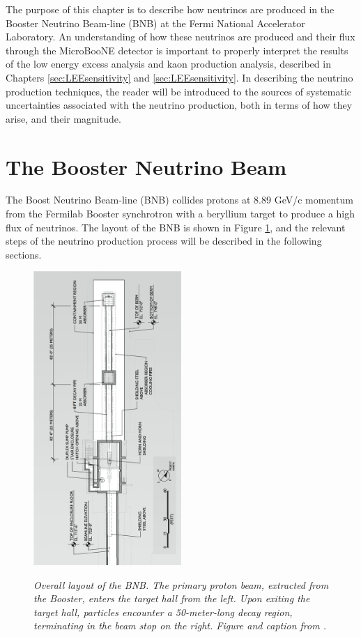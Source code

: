 The purpose of this chapter is to describe how neutrinos are produced in the Booster Neutrino Beam-line (BNB) at the Fermi National Accelerator Laboratory. An understanding of how these neutrinos are produced and their flux through the MicroBooNE detector is important to properly interpret the results of the low energy excess analysis and kaon production analysis, described in Chapters \ref{sec:LEEsensitivity} and \ref{sec:LEEsensitivity}. In describing the neutrino production techniques, the reader will be introduced to the sources of systematic uncertainties associated with the neutrino production, both in terms of how they arise, and their magnitude. 

\section{The Booster Neutrino Beam}\label{beam_descript_section}
The Boost Neutrino Beam-line (BNB) collides protons at 8.89 GeV/c momentum from the Fermilab Booster synchrotron with a beryllium target to produce a high flux of neutrinos. The layout of the BNB is shown in Figure \ref{BNB_layout_schematic}, and the relevant steps of the neutrino production process will be described in the following sections.

\begin{figure}[ht!]
\centering
	\includegraphics[width=0.5\textwidth]{Figures/BNB_layout_schematic.png} \\
\caption{\textit{Overall layout of the BNB. The primary proton beam, extracted from the Booster, enters the target hall from the left. Upon exiting the target hall, particles encounter a 50-meter-long decay region, terminating in the beam stop on the right. Figure and caption from \protect\cite{MBFluxPaper}.}}\label{BNB_layout_schematic}
\end{figure}

